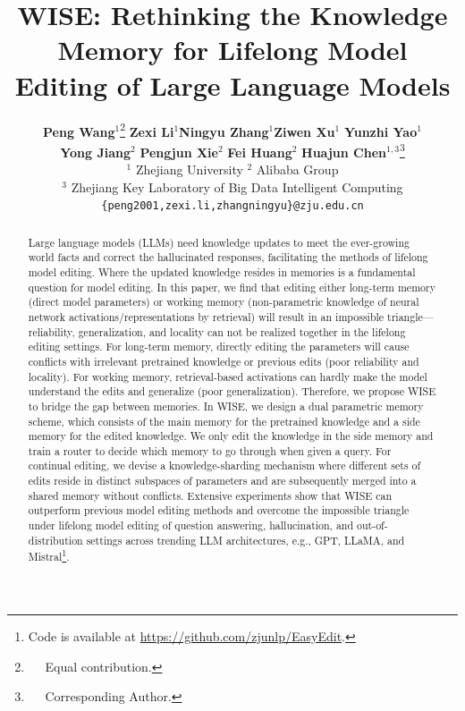 \documentclass{article}
\title{WISE: Rethinking the Knowledge Memory for Lifelong Model Editing of Large Language Models}
\author{
    \textbf{Peng Wang}$^1$\thanks{$\quad$ Equal contribution.} \quad \textbf{Zexi Li}$^{1}$\footnotemark[1] \quad \textbf{Ningyu Zhang}$^1$\footnotemark[2] \quad \textbf{Ziwen Xu}$^1$ \quad \textbf{Yunzhi Yao}$^1$ \\ \quad
    \textbf{Yong Jiang}$^{2}$ \quad \textbf{Pengjun Xie}$^2$ \quad \textbf{Fei Huang}$^2$  \quad \textbf{Huajun Chen}$^{1,3}$\thanks{$\quad$ Corresponding Author.} 
  \\ 
  $^1$ Zhejiang University \quad $^2$ Alibaba Group \quad  \\$^3$ Zhejiang Key Laboratory of Big Data Intelligent Computing\\
  \texttt{\{peng2001,zexi.li,zhangningyu\}@zju.edu.cn} \\ 
}
\begin{document}
\setlength{\parskip}{2.5pt plus1pt minus3pt}

\maketitle

\hypersetup{
  colorlinks   = true,
  urlcolor     = color1,
  linkcolor    = color1,
  citecolor   = color1
}
\begin{abstract}
    Large language models (LLMs) need knowledge updates to meet the ever-growing world facts and correct the hallucinated responses, facilitating the methods of lifelong model editing. Where the updated knowledge resides in memories is a fundamental question for model editing. In this paper, we find that editing either long-term memory (direct model parameters) or working memory (non-parametric knowledge of neural network activations/representations by retrieval) will result in an impossible triangle---reliability, generalization, and locality can not be realized together in the lifelong editing settings. For long-term memory, directly editing the parameters will cause conflicts with irrelevant pretrained knowledge or previous edits (poor reliability and locality). For working memory, retrieval-based activations can hardly make the model understand the edits and generalize (poor generalization). Therefore, we propose WISE to bridge the gap between memories. In WISE, we design a dual parametric memory scheme, which consists of the main memory for the pretrained knowledge and a side memory for the edited knowledge. We only edit the knowledge in the side memory and train a router to decide which memory to go through when given a query. For continual editing, we devise a knowledge-sharding mechanism where different sets of edits reside in distinct subspaces of parameters and are subsequently merged into a shared memory without conflicts. Extensive experiments show that WISE can outperform previous model editing methods and overcome the impossible triangle under lifelong model editing of question answering, hallucination, and out-of-distribution settings across trending LLM architectures, e.g., GPT, LLaMA, and Mistral\footnote{Code is available at \url{https://github.com/zjunlp/EasyEdit}.}.
    

\end{abstract}
\end{document}
